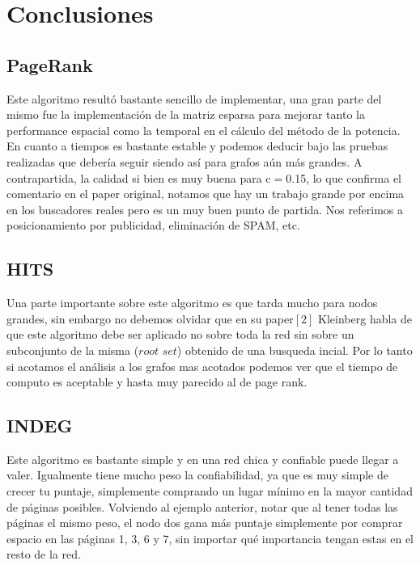 
\section{Conclusiones}

\subsection{PageRank}
Este algoritmo resultó bastante sencillo de implementar, una gran parte del mismo fue la implementación de la matriz esparsa para mejorar tanto la performance espacial como la temporal en el cálculo del método de la potencia. \\
En cuanto a tiempos es bastante estable y podemos deducir bajo las pruebas realizadas que debería seguir siendo así para grafos aún más grandes. A contrapartida, la calidad si bien es muy buena para c$=$0.15, lo que confirma el comentario en el paper original, notamos que hay un trabajo grande por encima en los buscadores reales pero es un muy buen punto de partida. Nos referimos a posicionamiento por publicidad, eliminación de SPAM, etc.

\subsection{HITS}

Una parte importante sobre este algoritmo es que tarda mucho para nodos grandes, sin embargo no debemos olvidar que en su paper$[2]$ Kleinberg habla de que este algoritmo debe ser aplicado no sobre toda la red sin sobre un subconjunto de la misma ($\textit{root set}$) obtenido de una busqueda incial. Por lo tanto si acotamos el análisis a los grafos mas acotados podemos ver que el tiempo de computo es aceptable y hasta muy parecido al de page rank. 

\subsection{INDEG}

Este algoritmo es bastante simple y en una red chica y confiable puede llegar a valer. Igualmente tiene mucho peso la confiabilidad, ya que es muy simple de crecer tu puntaje, simplemente comprando un lugar mínimo en la mayor cantidad de páginas posibles. Volviendo al ejemplo anterior, notar que al tener todas las páginas el mismo peso, el nodo dos gana más puntaje simplemente por comprar espacio en las páginas 1, 3, 6 y 7, sin importar qué importancia tengan estas en el resto de la red.

